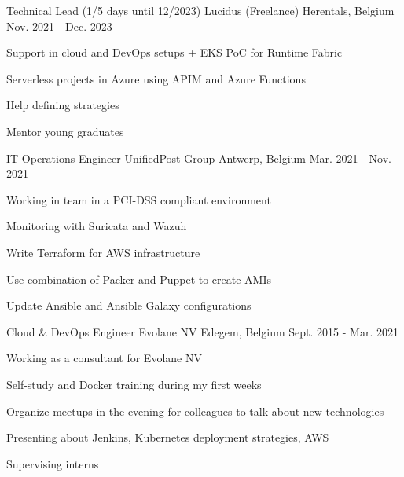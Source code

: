 \begin{cventries}
  \cventry
    {Technical Lead (1/5 days until 12/2023)} %
    {Lucidus (Freelance)} %
    {Herentals, Belgium} %
    {Nov. 2021 - Dec. 2023} %
    {
      \begin{cvitems} %
        \item {Support in cloud and DevOps setups + EKS PoC for Runtime Fabric}
        \item {Serverless projects in Azure using APIM and Azure Functions}
        \item {Help defining strategies}
        \item {Mentor young graduates}
      \end{cvitems}
    }

  \cventry
    {IT Operations Engineer} %
    {UnifiedPost Group} %
    {Antwerp, Belgium} %
    {Mar. 2021 - Nov. 2021} %
    {
      \begin{cvitems} %
        \item {Working in team in a PCI-DSS compliant environment}
        \item {Monitoring with Suricata and Wazuh}
        \item {Write Terraform for AWS infrastructure}
        \item {Use combination of Packer and Puppet to create AMIs}
        \item {Update Ansible and Ansible Galaxy configurations}
      \end{cvitems}
    }

  \cventry
    {Cloud \& DevOps Engineer} %
    {Evolane NV} %
    {Edegem, Belgium} %
    {Sept. 2015 - Mar. 2021} %
    {
      \begin{cvitems} %
        \item {Working as a consultant for Evolane NV}
        \item {Self-study and Docker training during my first weeks}
        \item {Organize meetups in the evening for colleagues to talk about new technologies}
        \item {Presenting about Jenkins, Kubernetes deployment strategies, AWS}
        \item {Supervising interns}
      \end{cvitems}
    }


\end{cventries}
